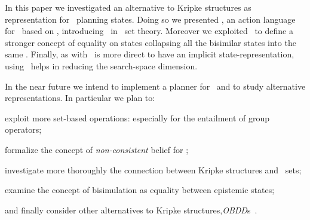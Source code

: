 In this paper we investigated an alternative to Kripke structures as representation for \mAGep\ planning states.
Doing so we presented \ourL, an action language for \mep\ based on \posS,
introducing \mep\ in \nwf\ set theory.
Moreover we exploited \posS\ to define a stronger concept of equality on states
collapsing %
all the bisimilar states into the same \pos.
Finally, as with \ourL\ is more direct to have an implicit state-representation, using \posS\ helps in reducing the search-space dimension.

In the near future we intend to implement a planner for \ourL\ and to study alternative representations. 
In particular we plan to:
\begin{enumerate*}[label=\roman*)]
\item exploit more set-based operations: especially for the entailment of group operators;
\item formalize the concept of \emph{non-consistent} belief for \ourL;
\item investigate more thoroughly the connection between Kripke structures and \nwf\ sets;
\item examine the concept of bisimulation as equality between epistemic states;
\item and finally consider other alternatives to Kripke structures,\eg \emph{OBDD}s~\cite{bryant1992symbolic,cimatti2000conformant}.
\end{enumerate*}
